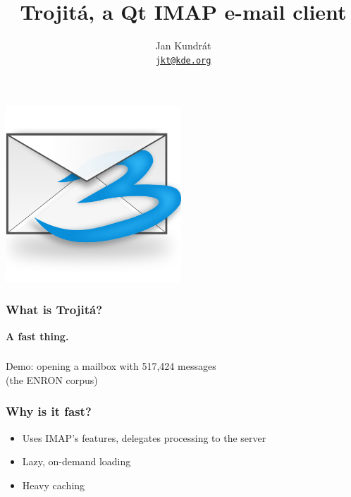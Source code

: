 \documentclass{beamer}
\begin{document}
\title{Trojitá, a Qt IMAP e-mail client}
\author{Jan Kundrát \\ \href{mailto:jkt@kde.org}{\nolinkurl{jkt@kde.org}}}
\date{}

\begin{frame}
\begin{center}
\includegraphics[width=66mm,clip, trim=0mm 20mm 0mm 30mm]{trojita-from-svg.png}
\maketitle
\end{center}
\end{frame}

\begin{frame}[fragile]
  \frametitle{What is Trojitá?}
  \begin{center}
    \textbf{\Huge{A fast thing.}}
  \end{center}
\end{frame}

\begin{frame}[fragile]
  \frametitle{}
  \begin{center}
    Demo: opening a mailbox with 517,424 messages \\ (the ENRON corpus)
  \end{center}
\end{frame}

\begin{frame}[fragile]
  \frametitle{Why is it fast?}
  \begin{itemize}
    \item Uses IMAP's features, delegates processing to the server
    \item Lazy, on-demand loading
    \item Heavy caching
  \end{itemize}
\end{frame}
\end{document}
